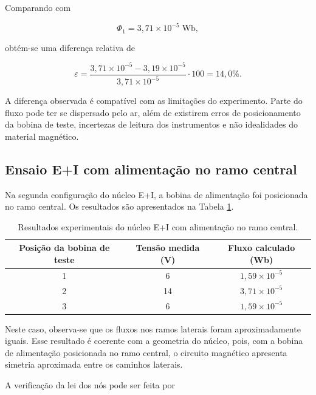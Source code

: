 \documentclass[11pt,a4paper]{article}
\begin{document}
Comparando com

\begin{equation} 
    \Phi_1 = 
    3,71 \times 10^{-5} 
    \; \text{Wb}, 
    \label{eq:phi1_lateral} 
\end{equation}

obtém-se uma diferença relativa de

\begin{equation} 
    \varepsilon = 
    \frac{3,71 \times 10^{-5} - 3,19 \times 10^{-5}} 
    {3,71 \times 10^{-5}} 
    \cdot 100 
    = 
    14,0\%. 
    \label{eq:erro_lateral} 
\end{equation}

A diferença observada é compatível com as limitações do experimento. Parte do fluxo pode ter se dispersado pelo ar, além de existirem erros de posicionamento da bobina de teste, incertezas de leitura dos instrumentos e não idealidades do material magnético.

\subsection{Ensaio E+I com alimentação no ramo central} Na segunda configuração do núcleo E+I, a bobina de alimentação foi posicionada no ramo central. Os resultados são apresentados na Tabela 
\ref{tab:ei_central}.

\begin{table}[H] 
    \centering 
    \caption{Resultados experimentais do núcleo E+I com alimentação no ramo central.} \label{tab:ei_central} 
    \begin{tabular}{ccc} 
        \toprule Posição da bobina de teste & Tensão medida (V) & Fluxo calculado (Wb) \\ 
        \midrule 
        1 & 6 & \(1,59 \times 10^{-5}\) \\ 
        2 & 14 & \(3,71 \times 10^{-5}\) \\ 
        3 & 6 & \(1,59 \times 10^{-5}\) \\ 
        \bottomrule 
    \end{tabular} 
\end{table}

Neste caso, observa-se que os fluxos nos ramos laterais foram aproximadamente iguais. Esse resultado é coerente com a geometria do núcleo, pois, com a bobina de alimentação posicionada no ramo central, o circuito magnético apresenta simetria aproximada entre os caminhos laterais.

A verificação da lei dos nós pode ser feita por
\end{document}
